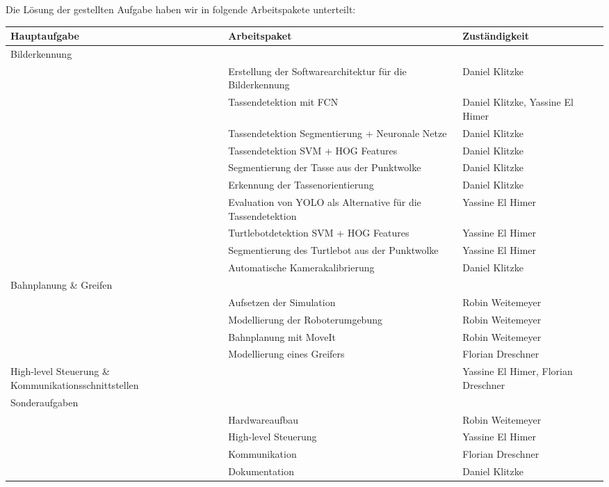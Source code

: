 Die Lösung der gestellten Aufgabe haben wir in folgende Arbeitspakete unterteilt:

\begin{tabular}{|p{5cm}|p{5cm}|p{5cm}|} \hline
Hauptaufgabe & Arbeitspaket & Zuständigkeit \\ \hline
Bilderkennung &  &  \\ \hline
& Erstellung der Softwarearchitektur für die Bilderkennung & Daniel Klitzke \\ \hline
 & Tassendetektion mit FCN & Daniel Klitzke, Yassine El Himer \\ \hline
 & Tassendetektion Segmentierung + Neuronale Netze & Daniel Klitzke \\ \hline
 & Tassendetektion SVM + HOG Features & Daniel Klitzke \\ \hline
 & Segmentierung der Tasse aus der Punktwolke & Daniel Klitzke \\ \hline
 & Erkennung der Tassenorientierung & Daniel Klitzke \\ \hline
 & Evaluation von YOLO als Alternative für die Tassendetektion & Yassine El Himer \\ \hline
 & Turtlebotdetektion SVM + HOG Features & Yassine El Himer \\ \hline
 & Segmentierung des Turtlebot aus der Punktwolke & Yassine El Himer \\ \hline
 & Automatische Kamerakalibrierung & Daniel Klitzke \\ \hline
 Bahnplanung \& Greifen & & \\ \hline
 & Aufsetzen der Simulation & Robin Weitemeyer \\ \hline
 & Modellierung der Roboterumgebung & Robin Weitemeyer \\ \hline
 & Bahnplanung mit MoveIt & Robin Weitemeyer \\ \hline
 & Modellierung eines Greifers & Florian Dreschner \\ \hline
 High-level Steuerung \& Kommunikationsschnittstellen & & Yassine El Himer, Florian Dreschner \\ \hline
 Sonderaufgaben & & \\ \hline
 & Hardwareaufbau & Robin Weitemeyer \\ \hline
 & High-level Steuerung & Yassine El Himer \\ \hline
 & Kommunikation & Florian Dreschner \\ \hline
 & Dokumentation & Daniel Klitzke \\ \hline

 \end{tabular}